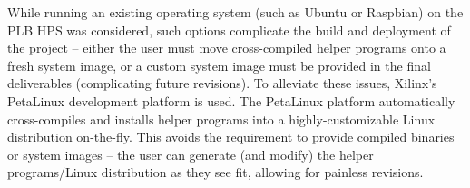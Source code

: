 While running an existing operating system (such as Ubuntu or Raspbian) on the PLB HPS was considered, such options complicate the build and deployment of the project -- either the user must move cross-compiled helper programs onto a fresh system image, or a custom system image must be provided in the final deliverables (complicating future revisions). To alleviate these issues, Xilinx's PetaLinux development platform\cite{petalinux} is used. The PetaLinux platform automatically cross-compiles and installs helper programs into a highly-customizable Linux distribution on-the-fly. This avoids the requirement to provide compiled binaries or system images -- the user can generate (and modify) the helper programs/Linux distribution as they see fit, allowing for painless revisions.
